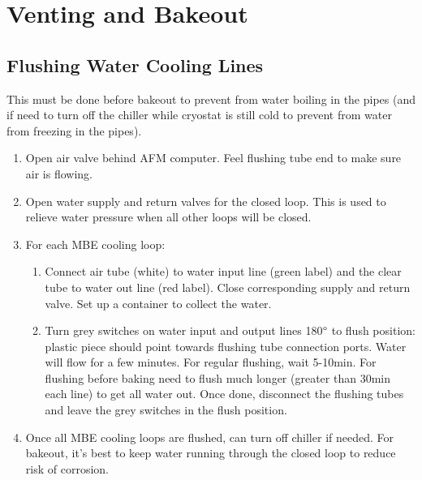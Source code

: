 \chapter{Venting and Bakeout}
\section{Flushing Water Cooling Lines}\label{flushing}
This must be done before bakeout to prevent from water boiling in the pipes (and if need to turn off the chiller while cryostat is still cold to prevent from water from freezing in the pipes).
\begin{enumerate}
\item	Open air valve behind AFM computer. Feel flushing tube end to make sure air is flowing.
\item	Open water supply and return valves for the closed loop. This is used to relieve water pressure when all other loops will be closed.
\item	For each MBE cooling loop:
\begin{enumerate}
\item	Connect air tube (white) to water input line (green label) and the clear tube to water out line (red label).  Close corresponding supply and return valve. Set up a container to collect the water.
\item	Turn grey switches on water input and output lines 180$\degree$ to flush position: plastic piece should point towards flushing tube connection ports. Water will flow for a few minutes. For regular flushing, wait 5-10min. For flushing before baking need to flush much longer (greater than 30min each line) to get all water out. Once done, disconnect the flushing tubes and leave the grey switches in the flush position. 
\end{enumerate}
\item	Once all MBE cooling loops are flushed, can turn off chiller if needed. For bakeout, it's best to keep water running through the closed loop to reduce risk of corrosion.
\end{enumerate}

